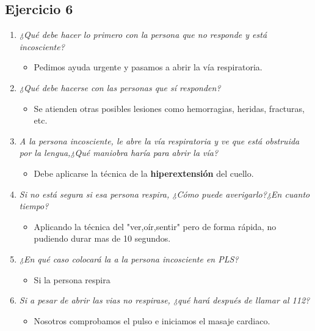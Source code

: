\documentclass{article}
\begin{document}
      \subsection{Ejercicio 6}
        \begin{enumerate}[label=(\alph*)]
          \item \textit{¿Qué debe hacer lo primero con la persona que no responde y está incosciente?}
            \begin{itemize}
              \item Pedimos ayuda urgente y pasamos a abrir la vía respiratoria.
            \end{itemize}
          \item \textit{¿Qué debe hacerse con las personas que sí responden?}
            \begin{itemize}
              \item Se atienden otras posibles lesiones como hemorragias, heridas, fracturas, etc.
            \end{itemize}
          \item \textit{A la persona incosciente, le abre la vía respiratoria y ve que está obstruida por la lengua,¿Qué maniobra haría para abrir la vía?}
            \begin{itemize}
              \item Debe aplicarse la técnica de la \textbf{hiperextensión} del cuello.
            \end{itemize}
          \item \textit{Si no está segura si esa persona respira, ¿Cómo puede averigarlo?¿En cuanto tiempo?}
            \begin{itemize}
              \item Aplicando la técnica del "ver,oír,sentir" pero de forma rápida, no pudiendo durar mas de 10 segundos.
            \end{itemize}
          \item \textit{¿En qué caso colocará la a la persona incosciente en PLS?}
            \begin{itemize}
              \item Si la persona respira
            \end{itemize}
          \item \textit{Si a pesar de abrir las vias no respirase, ¿qué hará después de llamar al 112?}
            \begin{itemize}
              \item Nosotros comprobamos el pulso e iniciamos el masaje cardiaco.
            \end{itemize}
        \end{enumerate}
\end{document}
